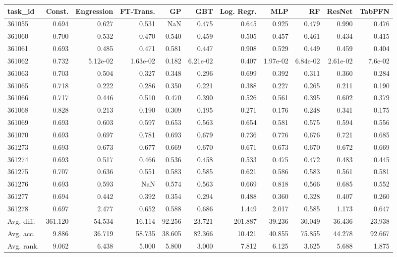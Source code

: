 \begin{tabular}{lrrrrrrrrrr}
\toprule
task\_id & Const. & Engression & FT-Trans. & GP & GBT & Log. Regr. & MLP & RF & ResNet & TabPFN \\
\midrule
361055 & 0.694 & 0.627 & 0.531 & NaN & 0.475 & 0.645 & 0.925 & 0.479 & 0.990 & 0.476 \\
361060 & 0.700 & 0.532 & 0.470 & 0.540 & 0.459 & 0.505 & 0.457 & 0.461 & 0.434 & 0.415 \\
361061 & 0.693 & 0.485 & 0.471 & 0.581 & 0.447 & 0.908 & 0.529 & 0.449 & 0.459 & 0.404 \\
361062 & 0.732 & 5.12e-02 & 1.63e-02 & 0.182 & 6.21e-02 & 0.407 & 1.97e-02 & 6.84e-02 & 2.61e-02 & 7.6e-02 \\
361063 & 0.703 & 0.504 & 0.327 & 0.348 & 0.296 & 0.699 & 0.392 & 0.311 & 0.360 & 0.284 \\
361065 & 0.718 & 0.222 & 0.286 & 0.350 & 0.221 & 0.388 & 0.227 & 0.265 & 0.211 & 0.190 \\
361066 & 0.717 & 0.446 & 0.510 & 0.470 & 0.390 & 0.526 & 0.561 & 0.395 & 0.602 & 0.379 \\
361068 & 0.828 & 0.213 & 0.190 & 0.309 & 0.195 & 0.271 & 0.176 & 0.248 & 0.341 & 0.175 \\
361069 & 0.693 & 0.603 & 0.597 & 0.653 & 0.563 & 0.654 & 0.581 & 0.575 & 0.594 & 0.556 \\
361070 & 0.693 & 0.697 & 0.781 & 0.693 & 0.679 & 0.736 & 0.776 & 0.676 & 0.721 & 0.685 \\
361273 & 0.693 & 0.673 & 0.677 & 0.669 & 0.670 & 0.671 & 0.673 & 0.670 & 0.672 & 0.669 \\
361274 & 0.693 & 0.517 & 0.466 & 0.536 & 0.458 & 0.533 & 0.475 & 0.472 & 0.483 & 0.445 \\
361275 & 0.707 & 0.636 & 0.551 & 0.583 & 0.585 & 0.621 & 0.586 & 0.583 & 0.561 & 0.581 \\
361276 & 0.693 & 0.593 & NaN & 0.574 & 0.563 & 0.669 & 0.818 & 0.566 & 0.685 & 0.552 \\
361277 & 0.694 & 0.442 & 0.392 & 0.354 & 0.294 & 0.488 & 0.360 & 0.328 & 0.407 & 0.260 \\
361278 & 0.697 & 2.477 & 0.652 & 0.588 & 0.686 & 1.449 & 2.017 & 0.585 & 1.173 & 0.647 \\
Avg. diff. & 361.120 & 54.534 & 16.114 & 92.256 & 23.721 & 201.887 & 39.236 & 30.049 & 36.436 & 23.938 \\
Avg. acc. & 9.886 & 36.719 & 58.735 & 38.605 & 82.366 & 10.421 & 40.855 & 75.855 & 44.278 & 92.667 \\
Avg. rank. & 9.062 & 6.438 & 5.000 & 5.800 & 3.000 & 7.812 & 6.125 & 3.625 & 5.688 & 1.875 \\
\bottomrule
\end{tabular}
